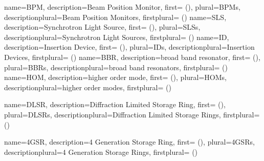 {
  name={BPM},
  description={Beam Position Monitor},
  first={ ()},
  plural={BPMs},
  descriptionplural={Beam Position Monitors},
  firstplural={ ()}
}
{
  name={SLS},
  description={Synchrotron Light Source},
  first={ ()},
  plural={SLSs},
  descriptionplural={Synchrotron Light Sources},
  firstplural={ ()}
}
{
  name={ID},
  description={Insertion Device},
  first={ ()},
  plural={IDs},
  descriptionplural={Insertion Devices},
  firstplural={ ()}
}
{
  name={BBR},
  description={broad band resonator},
  first={ ()},
  plural={BBRs},
  descriptionplural={broad band resonators},
  firstplural={ ()}
}
{
  name={HOM},
  description={higher order mode},
  first={ ()},
  plural={HOMs},
  descriptionplural={higher order modes},
  firstplural={ ()}
}

{
  name={DLSR},
  description={Diffraction Limited Storage Ring},
  first={ ()},
  plural={DLSRs},
  descriptionplural={Diffraction Limited Storage Rings},
  firstplural={ ()}
}

{
  name={4GSR},
  description={4 Generation Storage Ring},
  first={ ()},
  plural={4GSRs},
  descriptionplural={4 Generation Storage Rings},
  firstplural={ ()}
}